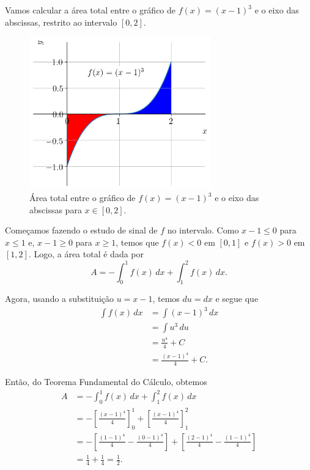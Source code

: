 \begin{ex}\label{ex:apint_arealiq}
  Vamos calcular a área total entre o gráfico de $f(x) = (x-1)^3$ e o eixo das abscissas, restrito ao intervalo $[0, 2]$.

  \begin{figure}[H]
    \centering
    \includegraphics[width=0.7\textwidth]{./cap_apint/dados/fig_ex_apint_arealiq/fig}
    \caption{Área total entre o gráfico de $f(x) = (x-1)^3$ e o eixo das abscissas para $x\in [0, 2]$.}
    \label{fig:ex_apint_arealiq}
  \end{figure}  

  Começamos fazendo o estudo de sinal de $f$ no intervalo. Como $x-1 \leq 0$ para $x\leq 1$ e, $x-1\geq 0$ para $x \geq 1$, temos que $f(x)<0$ em $[0, 1]$ e $f(x)>0$ em $[1, 2]$. Logo, a área total é dada por
  \begin{equation}
    A = -\int_0^1f(x)\,dx + \int_1^2f(x)\,dx.
  \end{equation}
  
  Agora, usando a substituição $u=x-1$, temos $du = dx$ e segue que
  \begin{align}
    \int f(x)\,dx &= \int (x-1)^3\,dx \\
                  &= \int u^3\,du \\
                  &= \frac{u^4}{4} + C \\
                  &= \frac{(x-1)^4}{4} + C.
  \end{align}

  Então, do Teorema Fundamental do Cálculo, obtemos
  \begin{align}
    A &= -\int_0^1f(x)\,dx + \int_1^2f(x)\,dx \\
      &= -\left[\frac{(x-1)^4}{4}\right]_0^1 + \left[\frac{(x-1)^4}{4}\right]_1^2 \\
      &= -\left[\frac{(1-1)^4}{4} - \frac{(0-1)^4}{4}\right] + \left[\frac{(2-1)^4}{4} - \frac{(1-1)^4}{4}\right] \\
      &= \frac{1}{4} + \frac{1}{4} = \frac{1}{2}.
  \end{align}


\end{ex}
